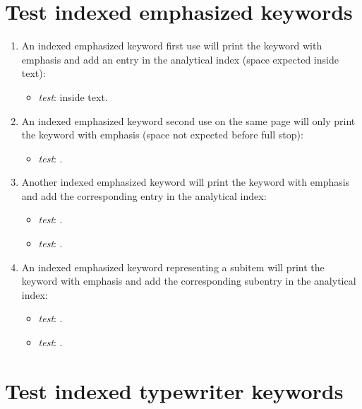 \section{Test indexed emphasized keywords}

\begin{enumerate}

\item An indexed emphasized keyword first use will print the keyword with emphasis and add an entry in the analytical index (space expected inside text):
\begin{itemize}
\item \textit{test}: \idxEmphKeyOne inside text.
\end{itemize}

\item An indexed emphasized keyword second use on the same page will only print the keyword with emphasis (space not expected before full stop): 
\begin{itemize}
\item \textit{test}: \idxEmphKeyOne.
\end{itemize}

\item Another indexed emphasized keyword will print the keyword with emphasis and add the corresponding entry in the analytical index: 
\begin{itemize}
\item \textit{test}: \idxEmphKeyTwo.
\item \textit{test}: \idxEmphKeyThree.
\end{itemize}

\item An indexed emphasized keyword representing a subitem will print the keyword with emphasis and add the corresponding subentry in the analytical index: 
\begin{itemize}
\item \textit{test}: \idxEmphKeyTwoSub.
\item \textit{test}: \idxEmphKeyThreeSubsub.
\end{itemize}

\end{enumerate}

\section{Test indexed typewriter keywords}

